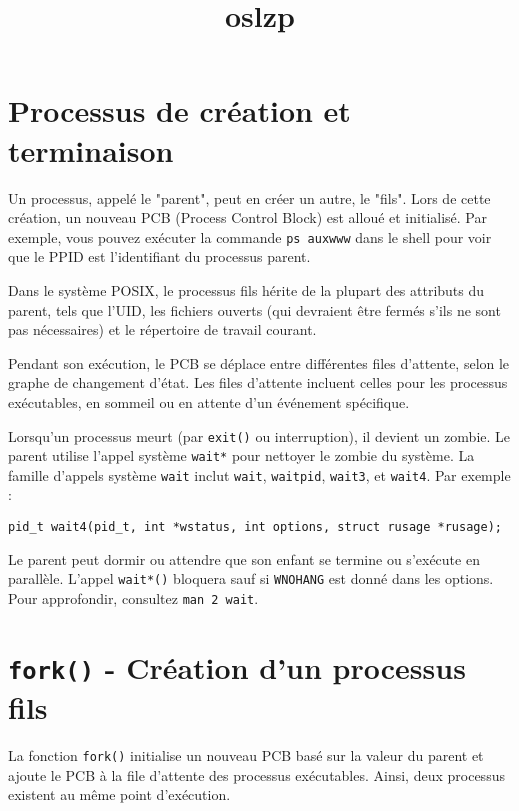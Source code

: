 \documentclass[12pt]{article}
\title{oslzp}
\author{}
\date{}
\begin{document}
\maketitle
\tableofcontents
\newpage

\section{Processus de création et terminaison}

Un processus, appelé le "parent", peut en créer un autre, le "fils". Lors de cette création, un nouveau PCB (Process Control Block) est alloué et initialisé. Par exemple, vous pouvez exécuter la commande \texttt{ps auxwww} dans le shell pour voir que le PPID est l'identifiant du processus parent.

Dans le système POSIX, le processus fils hérite de la plupart des attributs du parent, tels que l'UID, les fichiers ouverts (qui devraient être fermés s'ils ne sont pas nécessaires) et le répertoire de travail courant.

Pendant son exécution, le PCB se déplace entre différentes files d'attente, selon le graphe de changement d'état. Les files d'attente incluent celles pour les processus exécutables, en sommeil ou en attente d'un événement spécifique.

Lorsqu'un processus meurt (par \texttt{exit()} ou interruption), il devient un zombie. Le parent utilise l'appel système \texttt{wait*} pour nettoyer le zombie du système. La famille d'appels système \texttt{wait} inclut \texttt{wait}, \texttt{waitpid}, \texttt{wait3}, et \texttt{wait4}. Par exemple :

\begin{lstlisting}
pid_t wait4(pid_t, int *wstatus, int options, struct rusage *rusage);
\end{lstlisting}

Le parent peut dormir ou attendre que son enfant se termine ou s'exécute en parallèle. L'appel \texttt{wait*()} bloquera sauf si \texttt{WNOHANG} est donné dans les options. Pour approfondir, consultez \texttt{man 2 wait}.

\section{\texttt{fork()} - Création d'un processus fils}

La fonction \texttt{fork()} initialise un nouveau PCB basé sur la valeur du parent et ajoute le PCB à la file d'attente des processus exécutables. Ainsi, deux processus existent au même point d'exécution.
\end{document}

